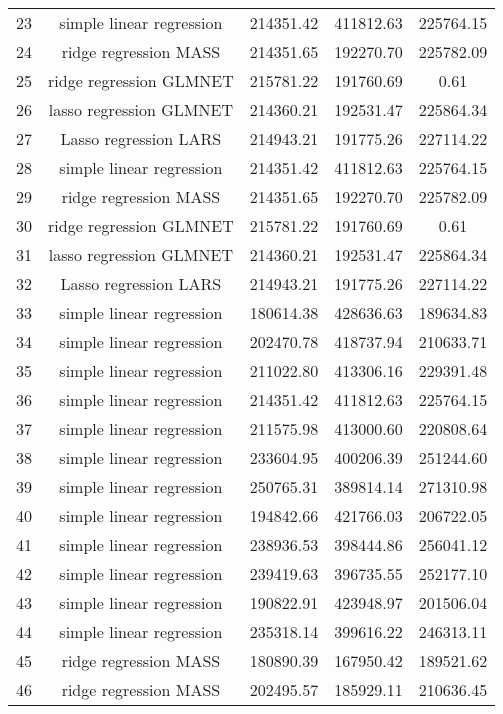 \begin{tabular}{ccccc}
  23 & simple linear regression & 214351.42 & 411812.63 & 225764.15 \\ 
  24 & ridge regression MASS & 214351.65 & 192270.70 & 225782.09 \\ 
  25 & ridge regression GLMNET & 215781.22 & 191760.69 & 0.61 \\ 
  26 & lasso regression GLMNET & 214360.21 & 192531.47 & 225864.34 \\ 
  27 & Lasso regression LARS & 214943.21 & 191775.26 & 227114.22 \\ 
  28 & simple linear regression & 214351.42 & 411812.63 & 225764.15 \\ 
  29 & ridge regression MASS & 214351.65 & 192270.70 & 225782.09 \\ 
  30 & ridge regression GLMNET & 215781.22 & 191760.69 & 0.61 \\ 
  31 & lasso regression GLMNET & 214360.21 & 192531.47 & 225864.34 \\ 
  32 & Lasso regression LARS & 214943.21 & 191775.26 & 227114.22 \\ 
  33 & simple linear regression & 180614.38 & 428636.63 & 189634.83 \\ 
  34 & simple linear regression & 202470.78 & 418737.94 & 210633.71 \\ 
  35 & simple linear regression & 211022.80 & 413306.16 & 229391.48 \\ 
  36 & simple linear regression & 214351.42 & 411812.63 & 225764.15 \\ 
  37 & simple linear regression & 211575.98 & 413000.60 & 220808.64 \\ 
  38 & simple linear regression & 233604.95 & 400206.39 & 251244.60 \\ 
  39 & simple linear regression & 250765.31 & 389814.14 & 271310.98 \\ 
  40 & simple linear regression & 194842.66 & 421766.03 & 206722.05 \\ 
  41 & simple linear regression & 238936.53 & 398444.86 & 256041.12 \\ 
  42 & simple linear regression & 239419.63 & 396735.55 & 252177.10 \\ 
  43 & simple linear regression & 190822.91 & 423948.97 & 201506.04 \\ 
  44 & simple linear regression & 235318.14 & 399616.22 & 246313.11 \\ 
  45 & ridge regression MASS & 180890.39 & 167950.42 & 189521.62 \\ 
  46 & ridge regression MASS & 202495.57 & 185929.11 & 210636.45 \\ 

\end{tabular}
